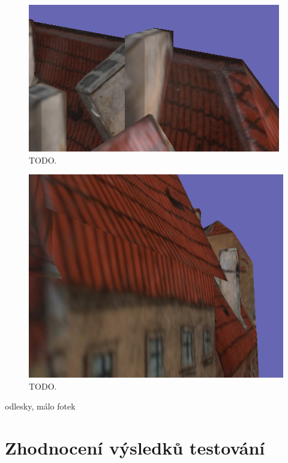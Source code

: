 \documentclass[11pt,twoside,a4paper]{book}
\begin{document}
\begin{figure}[h]
\begin{center}
\includegraphics[width=\textwidth]{figures/err-2}
\caption{TODO.}
\label{fig:err-2}
\end{center}
\end{figure}
\begin{figure}[h]
\begin{center}

\includegraphics[width=\textwidth]{figures/err-3}
\caption{TODO.}
\label{fig:err-3}
\end{center}
\end{figure}

odlesky, málo fotek

\section{Zhodnocení výsledků testování}
\end{document}
